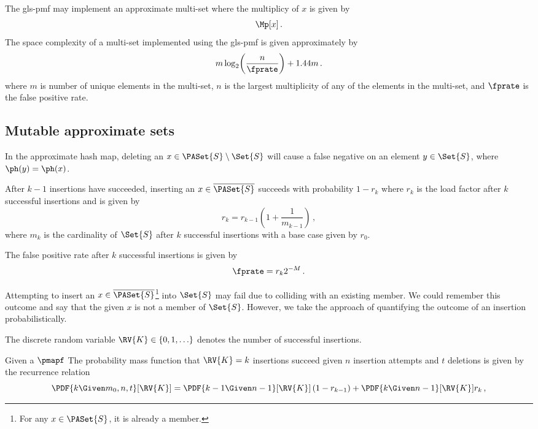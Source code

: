 \documentclass[ ../main.tex]{subfiles}
\begin{document}
The \gls{gls-pmf} may implement an approximate multi-set where the multiplicy of $x$ is given by
\begin{equation}
    \Mp[x]\,.
\end{equation}
The space complexity of a multi-set implemented using the \gls{gls-pmf} is given approximately by
\begin{equation}
    m \log_2 \!\left( \frac{n}{\fprate} \right) + 1.44 m\,.
\end{equation}
where $m$ is number of unique elements in the multi-set, $n$ is the largest multiplicity of any of the elements in the multi-set, and $\fprate$ is the false positive rate.

\subsection{Mutable approximate sets}
\label{sec:mutable}
In the approximate hash map, deleting an $x \in \PASet{S} \setminus \Set{S}$ will cause a false negative on an element $y \in \Set{S}$, where $\ph(y) = \ph(x)$.

After $k-1$ insertions have succeeded, inserting an $x \in \overline{\PASet{S}}$ succeeds with probability $1-r_k$ where $r_k$ is the load factor after $k$ successful insertions and is given by
\begin{equation}
    r_k = r_{k-1}\left(1 + \frac{1}{m_{k-1}}\right)\,,
\end{equation}
where $m_k$ is the cardinality of $\Set{S}$ after $k$ successful insertions with a base case given by $r_0$.

The false positive rate after $k$ successful insertions is given by
\begin{equation}
    \fprate = r_k 2^{-M}\,.
\end{equation}

Attempting to insert an $x \in \overline{\PASet{S}}$\footnote{For any $x \in \PASet{S}$, it is already a member.} into $\Set{S}$ may fail due to colliding with an existing member.
We could remember this outcome and say that the given $x$ is not a member of $\Set{S}$.
However, we take the approach of quantifying the outcome of an insertion probabilistically.

\begin{definition}
The discrete random variable $\RV{K} \in \{0, 1, \ldots\}$ denotes the number of successful insertions.
\end{definition}

Given a $\pmapf$ The probability mass function that $\RV{K} = k$ insertions succeed given $n$ insertion attempts and $t$ deletions is given by the recurrence relation
\begin{equation}
    \PDF{k \Given m_0, n, t}[\RV{K}] = \PDF{k-1 \Given n-1}[\RV{K}]\left(1 - r_{k-1}\right) + \PDF{k \Given n-1}[\RV{K}] r_k\,,
\end{equation}
\end{document}
